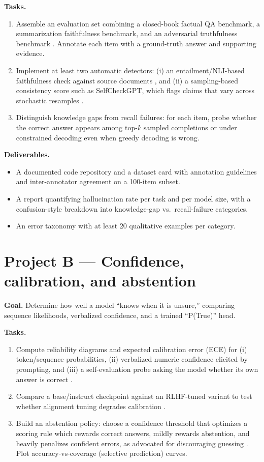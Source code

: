\documentclass[11pt]{article}
\begin{document}
\textbf{Tasks.}
\begin{enumerate}[leftmargin=*]
  \item Assemble an evaluation set combining a closed-book factual QA
    benchmark, a summarization faithfulness benchmark, and an adversarial
    truthfulness benchmark \citep{lin2022truthfulqa}. Annotate each item with a
    ground-truth answer and supporting evidence.
  \item Implement at least two automatic detectors: (i) an entailment/NLI-based
    faithfulness check against source documents
    \citep{maynez2020faithfulness}, and (ii) a sampling-based consistency score
    such as SelfCheckGPT, which flags claims that vary across stochastic
    resamples \citep{manakul2023selfcheckgpt}.
  \item Distinguish knowledge gaps from recall failures: for each item, probe
    whether the correct answer appears among top-$k$ sampled completions or
    under constrained decoding even when greedy decoding is wrong.
\end{enumerate}

\textbf{Deliverables.}
\begin{itemize}[leftmargin=*]
  \item A documented code repository and a dataset card with annotation
    guidelines and inter-annotator agreement on a 100-item subset.
  \item A report quantifying hallucination rate per task and per model size,
    with a confusion-style breakdown into knowledge-gap vs.\ recall-failure
    categories.
  \item An error taxonomy with at least 20 qualitative examples per category.
\end{itemize}

\section{Project B --- Confidence, calibration, and abstention}

\textbf{Goal.} Determine how well a model ``knows when it is unsure,'' comparing
sequence likelihoods, verbalized confidence, and a trained ``P(True)'' head.

\textbf{Tasks.}
\begin{enumerate}[leftmargin=*]
  \item Compute reliability diagrams and expected calibration error (ECE) for
    (i) token/sequence probabilities, (ii) verbalized numeric confidence
    elicited by prompting, and (iii) a self-evaluation probe asking the model
    whether its own answer is correct \citep{kadavath2022know}.
  \item Compare a base/instruct checkpoint against an RLHF-tuned variant to test
    whether alignment tuning degrades calibration \citep{openai2023gpt4}.
  \item Build an abstention policy: choose a confidence threshold that optimizes
    a scoring rule which rewards correct answers, mildly rewards abstention, and
    heavily penalizes confident errors, as advocated for discouraging guessing
    \citep{kalai2025hallucinate}. Plot accuracy-vs-coverage (selective
    prediction) curves.
\end{enumerate}
\end{document}
